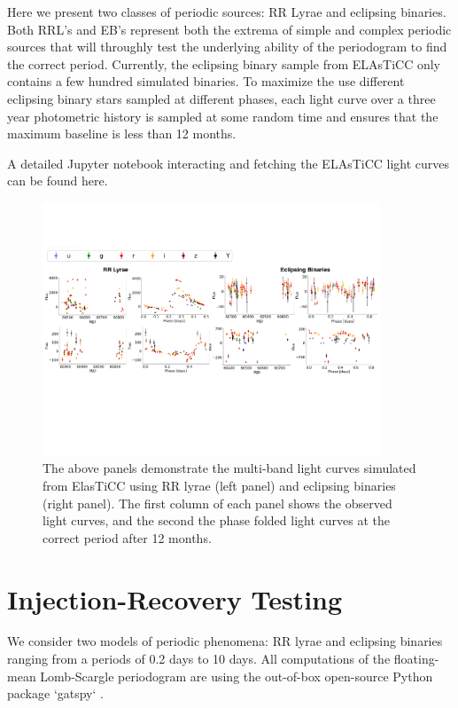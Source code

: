 \documentclass[DM,authoryear,toc]{lsstdoc}
\begin{document}
 Here we present two classes of periodic sources: RR Lyrae and eclipsing binaries. Both RRL's and EB's represent both the extrema of simple and complex periodic sources that will throughly test the underlying ability of the periodogram to find the correct period. Currently, the eclipsing binary sample from ELAsTiCC only contains a few hundred simulated binaries. To maximize the use different eclipsing binary stars sampled at different phases, each light curve over a three year photometric history is sampled at some random time and ensures that the maximum baseline is less than 12 months. 
 
 
A detailed Jupyter notebook interacting and fetching the ELAsTiCC light curves can be found here. 

\begin{figure}
  \includegraphics[width=0.9\textwidth]{figures/lightcurve_demo.pdf}
  \centering 
  \caption{The above panels demonstrate the multi-band light curves simulated from ElasTiCC using RR lyrae (left panel) and eclipsing binaries (right panel). The first column of each panel shows the observed light curves, and the second the phase folded light curves at the correct period after 12 months.}
  \label{fig:comp}
\end{figure}


\section{Injection-Recovery Testing}
We consider two models of periodic phenomena: RR lyrae and eclipsing binaries ranging from a periods of 0.2 days to 10 days. All computations of the floating-mean Lomb-Scargle periodogram are using the out-of-box open-source Python package `gatspy` \citet{VanderPlas:VP2015}. 
\end{document}
